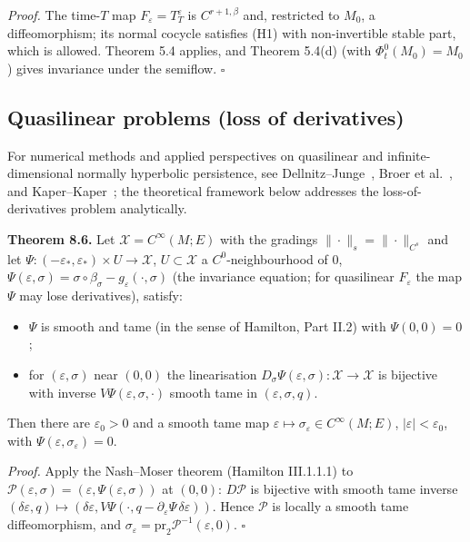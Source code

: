 \documentclass[11pt,a4paper]{article}
\theoremstyle{plain}
\theoremstyle{definition}
\theoremstyle{remark}
\numberwithin{equation}{section}
\numberwithin{figure}{section}
\begin{document}
\textit{Proof.} The time-$T$ map $F_\varepsilon=T^\varepsilon_T$ is $C^{r+1,\beta}$ and, restricted to $M_0$, a diffeomorphism; its normal cocycle satisfies (H1) with non-invertible stable part, which is allowed. Theorem 5.4 applies, and Theorem 5.4(d) (with $\Phi^0_t(M_0)=M_0$) gives invariance under the semiflow. $\square$

\subsection{Quasilinear problems (loss of derivatives)}

For numerical methods and applied perspectives on quasilinear and infinite-dimensional normally hyperbolic persistence, see Dellnitz–Junge~\cite{dell98}, Broer et al.~\cite{broe91}, and Kaper–Kaper~\cite{kape02}; the theoretical framework below addresses the loss-of-derivatives problem analytically.

\textbf{Theorem 8.6.} Let $\mathcal X=C^\infty(M;E)$ with the gradings $\|\cdot\|_s=\|\cdot\|_{C^s}$ and let $\Psi:(-\varepsilon_*,\varepsilon_*)\times U\to\mathcal X$, $U\subset\mathcal X$ a $C^0$-neighbourhood of $0$, $\Psi(\varepsilon,\sigma)=\sigma\circ\beta_\sigma-g_\varepsilon(\cdot,\sigma)$ (the invariance equation; for quasilinear $F_\varepsilon$ the map $\Psi$ may lose derivatives), satisfy:
\begin{itemize}
    \item[(Q1)] $\Psi$ is smooth and tame (in the sense of Hamilton, Part II.2) with $\Psi(0,0)=0$;
    \item[(Q2)] for $(\varepsilon,\sigma)$ near $(0,0)$ the linearisation $D_\sigma\Psi(\varepsilon,\sigma):\mathcal X\to\mathcal X$ is bijective with inverse $V\Psi(\varepsilon,\sigma,\cdot)$ smooth tame in $(\varepsilon,\sigma,q)$.
\end{itemize}
Then there are $\varepsilon_0>0$ and a smooth tame map $\varepsilon\mapsto\sigma_\varepsilon\in C^\infty(M;E)$, $|\varepsilon|<\varepsilon_0$, with $\Psi(\varepsilon,\sigma_\varepsilon)=0$.

\textit{Proof.} Apply the Nash–Moser theorem (Hamilton III.1.1.1) to $\mathcal P(\varepsilon,\sigma)=(\varepsilon,\Psi(\varepsilon,\sigma))$ at $(0,0)$: $D\mathcal P$ is bijective with smooth tame inverse $(\delta\varepsilon,q)\mapsto(\delta\varepsilon,V\Psi(\cdot,q-\partial_\varepsilon\Psi\,\delta\varepsilon))$. Hence $\mathcal P$ is locally a smooth tame diffeomorphism, and $\sigma_\varepsilon=\mathrm{pr}_2\mathcal P^{-1}(\varepsilon,0)$. $\square$
\end{document}
